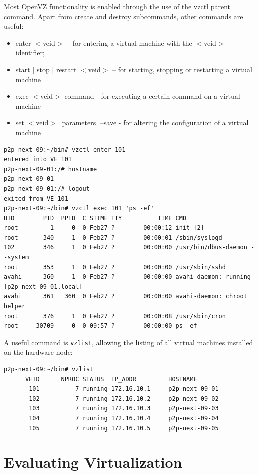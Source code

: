 Most OpenVZ functionality is enabled through the use of the vzctl parent
command. Apart from create and destroy subcommands, other commands are useful:

\begin{itemize}
  \item enter $<$veid$>$ -- for entering a virtual machine with the $<$veid$>$
  identifier;
  \item start $|$ stop $|$ restart $<$veid$>$ -- for starting, stopping or
  restarting a virtual machine
  \item exec $<$veid$>$ command - for executing a certain command on a virtual
  machine
  \item set $<$veid$>$ $[$parameters$]$ --save - for altering the
  configuration of a virtual machine
\end{itemize}

\footnotesize
\begin{verbatim}
p2p-next-09:~/bin# vzctl enter 101
entered into VE 101
p2p-next-09-01:/# hostname
p2p-next-09-01
p2p-next-09-01:/# logout
exited from VE 101
p2p-next-09:~/bin# vzctl exec 101 'ps -ef'
UID        PID  PPID  C STIME TTY          TIME CMD
root         1     0  0 Feb27 ?        00:00:12 init [2]
root       340     1  0 Feb27 ?        00:00:01 /sbin/syslogd
102        346     1  0 Feb27 ?        00:00:00 /usr/bin/dbus-daemon --system
root       353     1  0 Feb27 ?        00:00:00 /usr/sbin/sshd
avahi      360     1  0 Feb27 ?        00:00:00 avahi-daemon: running [p2p-next-09-01.local]
avahi      361   360  0 Feb27 ?        00:00:00 avahi-daemon: chroot helper
root       376     1  0 Feb27 ?        00:00:08 /usr/sbin/cron
root     30709     0  0 09:57 ?        00:00:00 ps -ef
\end{verbatim}
\normalsize

A useful command is \texttt{vzlist}, allowing the listing of all virtual
machines  installed on the hardware node:

\footnotesize
\begin{verbatim}
p2p-next-09:~/bin# vzlist
      VEID      NPROC STATUS  IP_ADDR         HOSTNAME
       101          7 running 172.16.10.1     p2p-next-09-01
       102          7 running 172.16.10.2     p2p-next-09-02
       103          7 running 172.16.10.3     p2p-next-09-03
       104          7 running 172.16.10.4     p2p-next-09-04
       105          7 running 172.16.10.5     p2p-next-09-05
\end{verbatim}
\normalsize

\section{Evaluating Virtualization}


